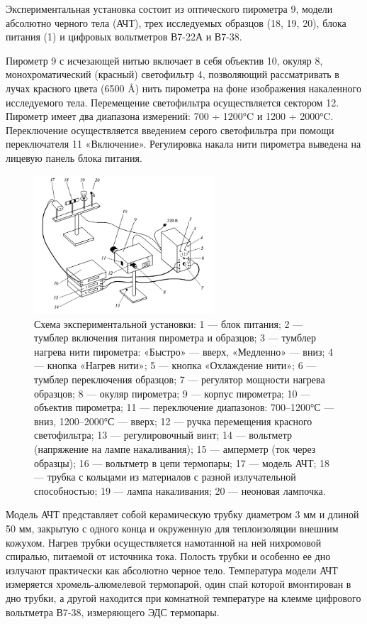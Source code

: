 \documentclass[a4paper,12pt]{article}
\begin{document}
Экспериментальная установка состоит из оптического пирометра 9, модели абсолютно черного тела (АЧТ), трех исследуемых образцов (18, 19, 20), блока питания (1) и цифровых вольтметров В7-22А и В7-38.

Пирометр 9 с исчезающей нитью включает в себя объектив 10, окуляр 8, монохроматический (красный) светофильтр 4, позволяющий рассматривать в лучах красного цвета (6500 Å) нить пирометра на фоне изображения накаленного исследуемого тела. Перемещение светофильтра осуществляется сектором 12. Пирометр имеет два диапазона измерений: 700 ÷ 1200°C и 1200 ÷ 2000°C. Переключение осуществляется введением серого светофильтра при помощи переключателя 11 «Включение». Регулировка накала нити пирометра выведена на лицевую панель блока питания.

\begin{figure}[h]
\centering
\includegraphics[width=0.6\textwidth]{img3.png}
\caption{Схема экспериментальной установки: 1 — блок питания; 2 — тумблер включения питания пирометра и образцов; 3 — тумблер нагрева нити пирометра: «Быстро» — вверх, «Медленно» — вниз; 4 — кнопка «Нагрев нити»; 5 — кнопка «Охлаждение нити»; 6 — тумблер переключения образцов; 7 — регулятор мощности нагрева образцов; 8 — окуляр пирометра; 9 — корпус пирометра; 10 — объектив пирометра; 11 — переключение диапазонов: 700–1200°С — вниз, 1200–2000°С — вверх; 12 — ручка перемещения красного светофильтра; 13 — регулировочный винт; 14 — вольтметр (напряжение на лампе накаливания); 15 — амперметр (ток через образцы); 16 — вольтметр в цепи термопары; 17 — модель АЧТ; 18 — трубка с кольцами из материалов с разной излучательной способностью; 19 — лампа накаливания; 20 — неоновая лампочка.}
\end{figure}

Модель АЧТ представляет собой керамическую трубку диаметром 3 мм и длиной 50 мм, закрытую с одного конца и окруженную для теплоизоляции внешним кожухом. Нагрев трубки осуществляется намотанной на ней нихромовой спиралью, питаемой от источника тока. Полость трубки и особенно ее дно излучают практически как абсолютно черное тело. Температура модели АЧТ измеряется хромель-алюмелевой термопарой, один спай которой вмонтирован в дно трубки, а другой находится при комнатной температуре на клемме цифрового вольтметра В7-38, измеряющего ЭДС термопары.
\end{document}
